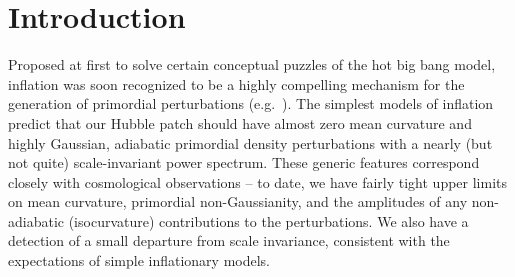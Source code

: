 \section{Introduction}



Proposed at first to solve certain conceptual puzzles of the hot big bang
model, inflation was soon recognized to be a highly compelling mechanism for
the generation of primordial perturbations
(e.g.\ \cite{Abbott:1986kb,Linde:2005ht,Lemoine:2008zz,EllisWands}).
The simplest models of inflation predict that our Hubble patch should have
almost zero mean curvature and highly Gaussian, adiabatic primordial density perturbations with a nearly (but not quite)
scale-invariant power spectrum.
These generic features correspond closely with cosmological observations --
to date, we have fairly tight upper limits on mean curvature, primordial
non-Gaussianity, and the amplitudes of any non-adiabatic (isocurvature)
contributions to the perturbations. We also have a detection of a small
departure from scale invariance, consistent with the expectations of simple
inflationary models.


